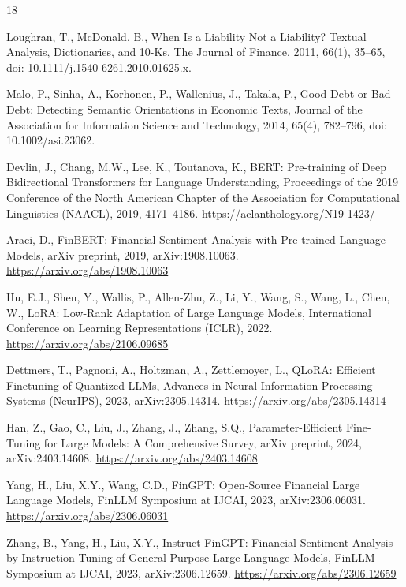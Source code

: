 \documentclass[a4paper]{article}
\begin{document}
\begin{thebibliography}{18}

Loughran, T., McDonald, B., When Is a Liability Not a Liability? Textual Analysis, Dictionaries, and 10-Ks, The Journal of Finance, 2011, 66(1), 35--65, doi: 10.1111/j.1540-6261.2010.01625.x.

Malo, P., Sinha, A., Korhonen, P., Wallenius, J., Takala, P., Good Debt or Bad Debt: Detecting Semantic Orientations in Economic Texts, Journal of the Association for Information Science and Technology, 2014, 65(4), 782--796, doi: 10.1002/asi.23062.

Devlin, J., Chang, M.W., Lee, K., Toutanova, K., BERT: Pre-training of Deep Bidirectional Transformers for Language Understanding, Proceedings of the 2019 Conference of the North American Chapter of the Association for Computational Linguistics (NAACL), 2019, 4171--4186. \url{https://aclanthology.org/N19-1423/}

Araci, D., FinBERT: Financial Sentiment Analysis with Pre-trained Language Models, arXiv preprint, 2019, arXiv:1908.10063. \url{https://arxiv.org/abs/1908.10063}

Hu, E.J., Shen, Y., Wallis, P., Allen-Zhu, Z., Li, Y., Wang, S., Wang, L., Chen, W., LoRA: Low-Rank Adaptation of Large Language Models, International Conference on Learning Representations (ICLR), 2022. \url{https://arxiv.org/abs/2106.09685}

Dettmers, T., Pagnoni, A., Holtzman, A., Zettlemoyer, L., QLoRA: Efficient Finetuning of Quantized LLMs, Advances in Neural Information Processing Systems (NeurIPS), 2023, arXiv:2305.14314. \url{https://arxiv.org/abs/2305.14314}

Han, Z., Gao, C., Liu, J., Zhang, J., Zhang, S.Q., Parameter-Efficient Fine-Tuning for Large Models: A Comprehensive Survey, arXiv preprint, 2024, arXiv:2403.14608. \url{https://arxiv.org/abs/2403.14608}

Yang, H., Liu, X.Y., Wang, C.D., FinGPT: Open-Source Financial Large Language Models, FinLLM Symposium at IJCAI, 2023, arXiv:2306.06031. \url{https://arxiv.org/abs/2306.06031}

Zhang, B., Yang, H., Liu, X.Y., Instruct-FinGPT: Financial Sentiment Analysis by Instruction Tuning of General-Purpose Large Language Models, FinLLM Symposium at IJCAI, 2023, arXiv:2306.12659. \url{https://arxiv.org/abs/2306.12659}


\end{thebibliography}
\end{document}
